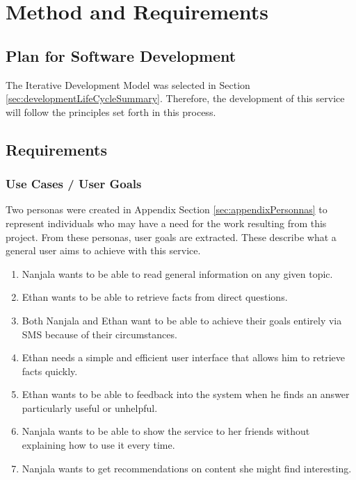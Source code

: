 \documentclass{article}
\begin{document}
\newpage
\section{Method and Requirements}
\label{sec:method}

\subsection{Plan for Software Development}
The Iterative Development Model was selected in Section \ref{sec:developmentLifeCycleSummary}.  Therefore, the development of this service will follow the principles set forth in this process.

\subsection{Requirements}
\subsubsection{Use Cases / User Goals}
Two personas were created in Appendix Section \ref{sec:appendixPersonnas} to represent individuals who may have a need for the work resulting from this project.  From these personas, user goals are extracted.  These describe what a general user aims to achieve with this service.
\begin{enumerate}
  \item Nanjala wants to be able to read general information on any given topic.
  \item Ethan wants to be able to retrieve facts from direct questions.
  \item Both Nanjala and Ethan want to be able to achieve their goals entirely via SMS because of their circumstances.
  \item Ethan needs a simple and efficient user interface that allows him to retrieve facts quickly. 
  \item Ethan wants to be able to feedback into the system when he finds an answer particularly useful or unhelpful. 
  \item Nanjala wants to be able to show the service to her friends without explaining how to use it every time.
  \item Nanjala wants to get recommendations on content she might find interesting. 
\end{enumerate}
\end{document}
